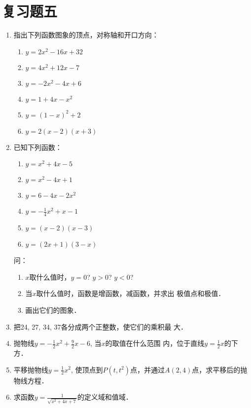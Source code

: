 \section*{复习题五}
\begin{enumerate}
    \item 指出下列函数图象的顶点，对称轴和开口方向：
\begin{multicols}{2}
\begin{enumerate}
    \item $y=2x^2-16x+32$
    \item $y=4x^2+12x-7$
    \item $y=-2x^2-4x+6$
    \item $y=1+4x-x^2$
    \item $y=(1-x)^2+2$
    \item $y=2(x-2)(x+3)$
\end{enumerate}
\end{multicols}
   \item  已知下列函数：
\begin{multicols}{2}
\begin{enumerate}
\item $y=x^2+4x-5$
\item $y=x^2-4x+1$
\item $y=6-4x-2x^2$
\item $y=-\frac{1}{4}x^2+x-1$
\item $y=(x-2)(x-3)$
\item $y=(2x+1)(3-x)$
\end{enumerate}
\end{multicols}
   问： \begin{enumerate}
       \item $x$取什么值时，$y=0$? $y>0$? $y<0$?
       \item 当$x$取什么值时，函数是增函数，减函数，并求出
   极值点和极值．
   \item 画出它们的图象．
   \end{enumerate}
\item 把24, 27, 34, 37各分成两个正整数，使它们的乘积最
大．
\item 抛物线$y=-\frac{1}{2}x^2+\frac{9}{2}x-6$, 当$x$的取值在什么范围
内，位于直线$y=\frac{1}{2}x$的下方．
\item 平移抛物线$y=\frac{1}{2}x^2$, 使顶点到$P(t,t^2)$点，并通过$A(2,
4)$点，求平移后的抛物线方程．


\item 求函数$y=\frac{1}{\sqrt{x^2+4x+7}}$的定义域和值域．


\end{enumerate}
